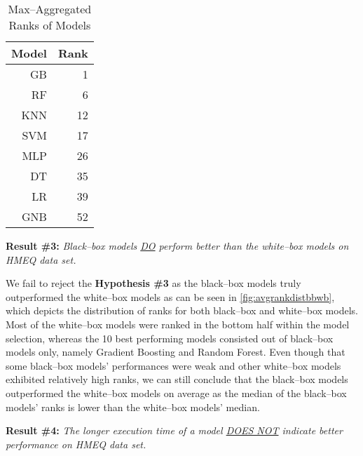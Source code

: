 \begin{table}[H]
    \small
    \setlength{\tabcolsep}{8pt}
    \renewcommand{\arraystretch}{1.3}
    \centering
        \caption[Max--Aggregated Ranks of Models]{Max--Aggregated Ranks of Models}\label{tab:maxranks}
        \begin{tabular}{r r}
    \toprule
    \textbf{Model} & \textbf{Rank}\\
    \midrule
    \hline
    GB & 1 \\ 
    RF & 6 \\ 
    KNN & 12 \\ 
    SVM & 17 \\ 
    MLP & 26 \\ 
    DT & 35 \\ 
    LR & 39 \\
    GNB & 52 \\
    \hline
    \bottomrule
    \end{tabular}
    \vspace{0.35em}

        \vspace{-1em}
\end{table}

\vspace{0.3cm}

\noindent \textbf{Result \#3:} \textit{Black--box models \underline{DO} perform better than the white--box models on HMEQ data set.}

We fail to reject the \textbf{Hypothesis \#3} as the black--box models truly outperformed the white--box models as can be seen in \autoref{fig:avgrankdistbbwb}, which depicts the distribution of ranks for both black--box and white--box models.
Most of the white--box models were ranked in the bottom half within the model selection, whereas the 10 best performing models consisted out of black--box models only, namely Gradient Boosting and Random Forest.
Even though that some black--box models' performances were weak and other white--box models exhibited relatively high ranks, we can still conclude that the black--box models outperformed the white--box models on average as the median of the black--box models' ranks is lower than the white--box models' median.
\vspace{0.3cm}

\noindent \textbf{Result \#4:} \textit{The longer execution time of a model \underline{DOES NOT} indicate better performance on HMEQ data set.}

